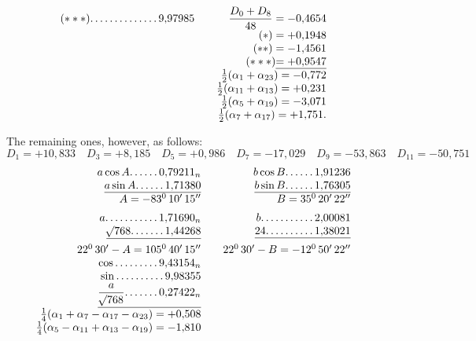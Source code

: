 \begin{landscape}
\[\begin{array}{@{}r@{\qquad}r@{\qquad}r@{}}
\begin{array}[t]{@{}r@{}}
(***)\VfourDots{13}9{,}97985
\end{array}
&\begin{array}[t]{@{}r@{}}
\dfrac{D_0+D_8}{48}=-0{,}4654\\
(*)=+0{,}1948\\
(**)=-1{,}4561\\
(***)\underline{=+0{,}9547}\\
\tfrac12(\alpha_1+\alpha_{23})=-0{,}772\\
\tfrac12(\alpha_{11}+\alpha_{13})=+0{,}231\\
\tfrac12(\alpha_5+\alpha_{19})=-3{,}071\\
\tfrac12(\alpha_7+\alpha_{17})=+1{,}751.
\end{array}
\end{array}
\]
\par\noindent\hspace*{\parindent}The remaining ones, however, as follows:
\[D_1=+10{,}833\quad D_3=+8{,}185\quad D_5=+0{,}986\quad D_7=-17{,}029\quad D_9=-53{,}863\quad D_{11}=-50{,}751\]
\[
\begin{array}{@{}r@{\qquad}r@{\qquad}r@{}}
\begin{array}[t]{@{}r@{}}
a\cos A\VfourDots{5}0{,}79211_n\\
\underline{a\sin A\VfourDots{5}1{,}71380}\\
A=-83^0\,10'\,15''\\[5pt]
a\VfourDots{10}1{,}71690_n\\
\underline{\BareRoot{768}\VfourDots{6}1{,}44268}\\[5pt]
22^0\,30'-A=105^0\,40'\,15''\\
\cos\VfourDots{8}9{,}43154_n\\
\sin\VfourDots{9}9{,}98355\\
\underline{\dfrac{a}{\BareRoot{768}}\VfourDots{6}0{,}27422_n}\\[5pt]
\tfrac14(\alpha_1+\alpha_7-\alpha_{17}-\alpha_{23})=+0{,}508\\
\tfrac14(\alpha_5-\alpha_{11}+\alpha_{13}-\alpha_{19})=-1{,}810
\end{array}
&\begin{array}[t]{@{}r@{}}
b\cos B\VfourDots{5}1{,}91236\\
\underline{b\sin B\VfourDots{5}1{,}76305}\\
B=35^0\,20'\,22''\\[5pt]
b\VfourDots{10}2{,}00081\\
\underline{24\VfourDots{9}1{,}38021}\\[5pt]
22^0\,30'-B=-12^0\,50'\,22''\\

\end{array}
\end{array}\]
\end{landscape}
